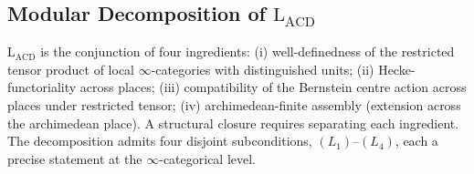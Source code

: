 \subsection{Modular Decomposition of \(\mathrm{L}_{\mathrm{ACD}}\)}
\label{v4-arith:acd:obstruction-1}

\(\mathrm{L}_{\mathrm{ACD}}\) is the conjunction of four ingredients:
(i) well-definedness of the restricted tensor product of local
\(\infty\)-categories with distinguished units;
(ii) Hecke-functoriality across places;
(iii) compatibility of the Bernstein centre action across places
under restricted tensor;
(iv) archimedean-finite assembly (extension across the archimedean
place).
A structural closure requires separating each ingredient. The
decomposition admits four disjoint subconditions,
\((L_{1})\)--\((L_{4})\), each a precise statement at the
\(\infty\)-categorical level.

